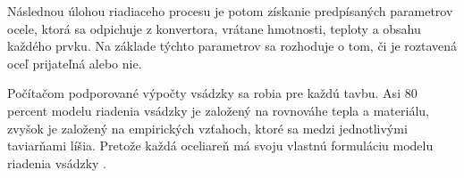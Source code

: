 \documentclass[]{tukediphc}
\begin{document}
Následnou úlohou riadiaceho procesu je potom získanie predpísaných parametrov ocele, ktorá sa odpichuje z konvertora, vrátane hmotnosti, teploty a obsahu každého prvku. Na základe týchto parametrov sa rozhoduje o tom, či je roztavená oceľ prijateľná alebo nie.

Počítačom podporované výpočty vsádzky sa robia pre každú tavbu. Asi 80 percent modelu riadenia vsádzky je založený na rovnováhe tepla a materiálu, zvyšok je založený na empirických vzťahoch, ktoré sa medzi jednotlivými taviarňami líšia. Pretože každá oceliareň má svoju vlastnú formuláciu modelu riadenia vsádzky \cite{Turkdogan1996}.



%

%
\end{document}
